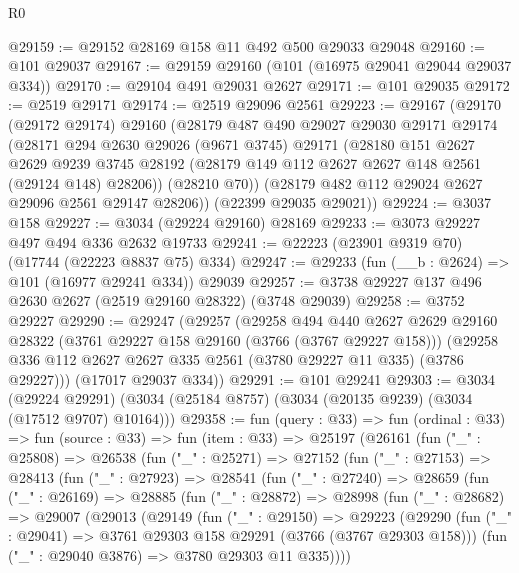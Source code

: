 \begin{lexlean}{R0}
\begin{coremodule}
@29159 := @29152 @28169 @158 @11 @492 @500 @29033 @29048
@29160 := @101 @29037
@29167 := @29159 @29160 (@101 (@16975 @29041 @29044 @29037 @334))
@29170 := @29104 @491 @29031 @2627
@29171 := @101 @29035
@29172 := @2519 @29171
@29174 := @2519 @29096 @2561
@29223 := @29167
    (@29170
      (@29172 @29174)
      @29160
      (@28179
        @487
        @490
        @29027
        @29030
        @29171
        @29174
        (@28171
          @294
          @2630
          @29026
          (@9671 @3745)
          @29171
          (@28180
            @151
            @2627
            @2629
            @9239
            @3745
            @28192
            (@28179 @149 @112 @2627 @2627 @148 @2561 (@29124 @148) @28206))
          (@28210 @70))
        (@28179 @482 @112 @29024 @2627 @29096 @2561 @29147 @28206))
      (@22399 @29035 @29021))
@29224 := @3037 @158
@29227 := @3034 (@29224 @29160) @28169
@29233 := @3073 @29227 @497 @494 @336 @2632 @19733
@29241 := @22223 (@23901 @9319 @70) (@17744 (@22223 @8837 @75) @334)
@29247 := @29233 (fun (__b : @2624) => @101 (@16977 @29241 @334)) @29039
@29257 := @3738 @29227 @137 @496 @2630 @2627 (@2519 @29160 @28322) (@3748 @29039)
@29258 := @3752 @29227
@29290 := @29247
    (@29257
      (@29258
        @494
        @440
        @2627
        @2629
        @29160
        @28322
        (@3761 @29227 @158 @29160 (@3766 (@3767 @29227 @158)))
        (@29258 @336 @112 @2627 @2627 @335 @2561 (@3780 @29227 @11 @335) (@3786 @29227)))
      (@17017 @29037 @334))
@29291 := @101 @29241
@29303 := @3034
    (@29224 @29291)
    (@3034 (@25184 @8757) (@3034 (@20135 @9239) (@3034 (@17512 @9707) @10164)))
@29358 := fun (query : @33) =>
  fun (ordinal : @33) =>
  fun (source : @33) =>
  fun (item : @33) =>
  @25197
    (@26161
      (fun ("_" : @25808) =>
      @26538
        (fun ("_" : @25271) =>
        @27152
          (fun ("_" : @27153) =>
          @28413
            (fun ("_" : @27923) =>
            @28541
              (fun ("_" : @27240) =>
              @28659
                (fun ("_" : @26169) =>
                @28885
                  (fun ("_" : @28872) =>
                  @28998
                    (fun ("_" : @28682) =>
                    @29007
                      (@29013
                        (@29149
                          (fun ("_" : @29150) =>
                          @29223
                            (@29290
                              (fun ("_" : @29041) =>
                              @3761 @29303 @158 @29291 (@3766 (@3767 @29303 @158)))
                              (fun ("_" : @29040 @3876) => @3780 @29303 @11 @335))))

\end{coremodule}
\end{lexlean}
